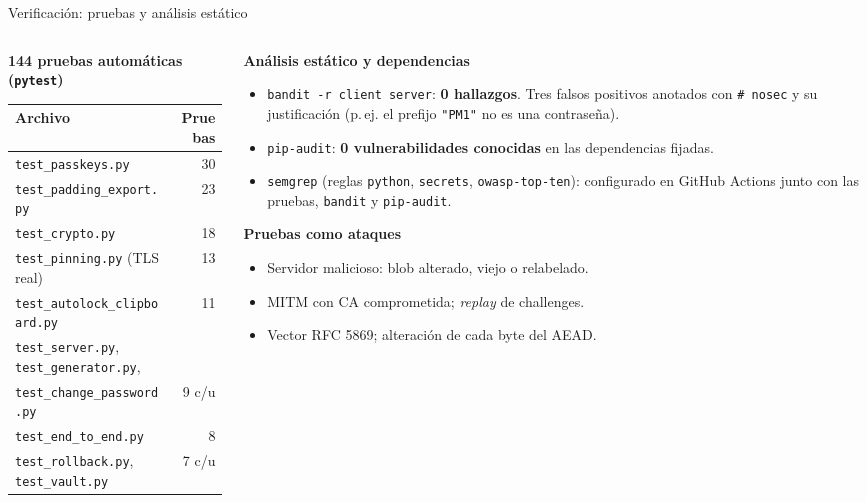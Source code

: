 \documentclass[aspectratio=169,10pt]{beamer}
\begin{document}
\begin{frame}{Verificación: pruebas y análisis estático}
  \begin{columns}[T]
    \begin{column}{0.47\textwidth}
      \centering\scriptsize
      \textbf{144 pruebas automáticas (\texttt{pytest})}
      \vspace{1mm}

      \begin{tabular}{@{}l r@{}}
        \toprule
        \textbf{Archivo} & \textbf{Pruebas} \\
        \midrule
        \texttt{test\_passkeys.py}           & 30 \\
        \texttt{test\_padding\_export.py}    & 23 \\
        \texttt{test\_crypto.py}             & 18 \\
        \texttt{test\_pinning.py} (TLS real) & 13 \\
        \texttt{test\_autolock\_clipboard.py} & 11 \\
        \texttt{test\_server.py}, \texttt{test\_generator.py}, & \\
        \quad\texttt{test\_change\_password.py} & 9 c/u \\
        \texttt{test\_end\_to\_end.py}       & 8 \\
        \texttt{test\_rollback.py}, \texttt{test\_vault.py} & 7 c/u \\
        \bottomrule
      \end{tabular}
    \end{column}
    \begin{column}{0.51\textwidth}
      \small
      \textbf{Análisis estático y dependencias}
      \begin{itemize}\footnotesize
        \item \texttt{bandit -r client server}: \textbf{0 hallazgos}. Tres falsos positivos
              anotados con \texttt{\# nosec} y su justificación (p.\,ej. el prefijo
              \texttt{"PM1"} no es una contraseña).
        \item \texttt{pip-audit}: \textbf{0 vulnerabilidades conocidas} en las dependencias fijadas.
        \item \texttt{semgrep} (reglas \texttt{python}, \texttt{secrets}, \texttt{owasp-top-ten}):
              configurado en GitHub Actions junto con las pruebas, \texttt{bandit} y \texttt{pip-audit}.
      \end{itemize}
      \textbf{Pruebas como ataques}
      \begin{itemize}\footnotesize
        \item Servidor malicioso: blob alterado, viejo o relabelado.
        \item MITM con CA comprometida; \emph{replay} de challenges.
        \item Vector RFC 5869; alteración de cada byte del AEAD.
      \end{itemize}
    \end{column}
  \end{columns}
\end{frame}
\end{document}
